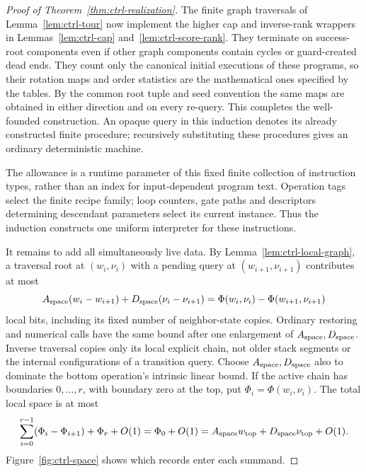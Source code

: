 \begin{proof}[Proof of Theorem~\ref{thm:ctrl-realization}]
The finite graph traversals of Lemma~\ref{lem:ctrl-tour} now implement
the higher cap and inverse-rank wrappers in
Lemmas~\ref{lem:ctrl-cap} and~\ref{lem:ctrl-score-rank}.  They terminate
on success-root components even if other graph components contain
cycles or guard-created dead ends.  They count only the canonical
initial executions of these programs, so their rotation maps and order statistics
are the mathematical ones specified by the tables.  By the common root
tuple and seed convention the same maps are obtained in either
direction and on every re-query.  This completes the well-founded
construction.  An opaque query in this induction denotes its already
constructed finite procedure; recursively substituting these
procedures gives an ordinary deterministic machine.

The allowance is a runtime parameter of this fixed finite collection of
instruction types, rather than an index for input-dependent program
text.  Operation tags select the finite recipe family; loop counters,
gate paths and descriptors determining descendant parameters select its current instance.
Thus the induction constructs one uniform interpreter for these
instructions.

It remains to add all simultaneously live data.  By
Lemma~\ref{lem:ctrl-local-graph}, a traversal root at $(w_i,\nu_i)$ with a
pending query at $(w_{i+1},\nu_{i+1})$ contributes at most
\begin{equation}\label{eq:ctrl-stack-segment}
 A_{\rm space}(w_i-w_{i+1})+D_{\rm space}(\nu_i-\nu_{i+1})
 =\Phi(w_i,\nu_i)-\Phi(w_{i+1},\nu_{i+1})
\end{equation}
local bits, including its fixed number of neighbor-state copies.
Ordinary restoring and numerical calls have the same bound after one
enlargement of $A_{\rm space},D_{\rm space}$.  Inverse traversal copies only its local explicit
chain, not older stack segments or the internal configurations of a
transition query.  Choose $A_{\rm space},D_{\rm space}$ also to dominate the bottom operation's
intrinsic linear bound.  If the active chain has boundaries
$0,\ldots,r$, with boundary zero at the top, put
$\Phi_i=\Phi(w_i,\nu_i)$.  The total local space is at most
\[
 \sum_{i=0}^{r-1}(\Phi_i-\Phi_{i+1})+\Phi_r+O(1)
 =\Phi_0+O(1)
 =A_{\rm space}w_{\mathrm{top}}+D_{\rm space}\nu_{\mathrm{top}}+O(1).
\]
Figure~\ref{fig:ctrl-space} shows which records enter each summand.




\end{proof}
